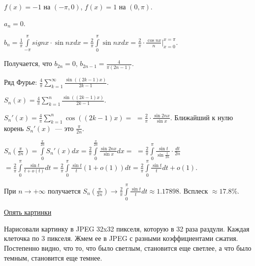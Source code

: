 \begin{example}
    $f(x) = -1$ на $(-\pi, 0)$,
    $f(x) = 1$ на $(0, \pi)$.

    $a_n = 0$.

    $b_n = \frac{1}{\pi} \int \limits_{-\pi}^{\pi} sign x \cdot \sin nx dx = \frac{2}{\pi}\int \limits_{0}^{\pi} \sin nx dx =
        \frac{2}{\pi} \cdot \frac{\cos nx}{n} \bigr|_{x = 0}^{x = \pi}$.

    Получается, что $b_{2n} = 0$, $b_{2n - 1} = \frac{4}{\pi(2n-1)}$.

    Ряд Фурье: $\frac{4}{\pi} \sum \limits_{k = 1}^{\infty} \frac{\sin ((2k -1)x)}{2k - 1}$.

    $S_n(x) = \frac{4}{\pi} \sum \limits_{k = 1}^{n} \frac{\sin ((2k -1)x)}{2k - 1}$.

    $S_n'(x) = \frac{4}{\pi} \sum \limits_{k = 1}^{n} \cos((2k - 1)x) =$ 
    $ = \frac{2}{\pi} \cdot \frac{\sin 2nx}{\sin x}$.
    Ближайший к нулю корень $S_n'(x)$~--- это $\frac{\pi}{2n}$.

    $S_n(\frac{\pi}{2n}) = \int \limits_{0}^{\frac{\pi}{2 n}} S_n'(x) dx = \frac{2}{\pi} \int \limits_{0}^{\frac{\pi}{2n}} \frac{\sin 2nx}{\sin x} dx = $
     $ = \frac{2}{\pi} \int \limits_{0}^{\pi} \frac{\sin t}{\sin \frac{t}{2n}} \cdot \frac{dt}{2n}$
    $ = \frac{2}{\pi} \int \limits_{0}^{\pi}  \frac{\sin t}{t + o(t)} dt = \frac{2}{\pi} \int \limits_{0}^{\pi} \frac{\sin t}{t} (1 + o(1)) dt = \frac{2}{\pi} \int \limits_{0}^{\pi} \frac{\sin t}{t} dt + o(1)$.

    При $n \to +\infty$ получается $S_n(\frac{\pi}{2 n}) \to \frac{2}{\pi} \int \limits_{0}^{\pi} \frac{\sin t}{t} dt \approx 1.17898$. Всплеск $\approx 17.8\%$.

    \href{https://youtu.be/ngQduNsEq3E?list=PLodheWE7A8z9ri1dXoa9rGn6TgpdWtGlt&t=7371}{Опять картинки}

    Нарисовали картинку в JPEG 32x32 пикселя, которую в 32 раза раздули. Каждая клеточка по 3 пикселя. Жмем ее в JPEG с разными коэффициентами сжатия. Постепенно видно, что то, что было светлым, становится еще светлее, а что было темным, становится еще темнее.
\end{example}
